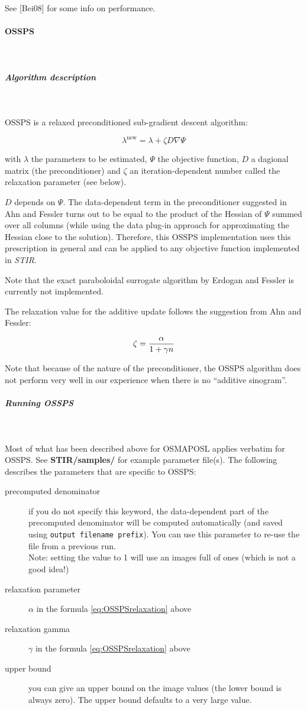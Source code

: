 \documentclass{article}
\newcommand{\subsubsubsection}[1]{\paragraph{#1}\mbox{} \\}
\newcommand{\subsubsubsubsection}[1]{\subparagraph{#1} \mbox{} \\}
\begin{document}
See [Bei08] for some info on performance.

{ \subsubsubsection{OSSPS}
}
\label{sec:OSSPS}
  { \subsubsubsubsection{Algorithm description}
  }
  OSSPS is a relaxed preconditioned sub-gradient descent algorithm:

  \[ \lambda^\mathrm{new} = \lambda + \zeta D \nabla \Psi \]

  with $\lambda$ the parameters to be estimated,
  $\Psi$ the objective function,
  $D$ a dagional matrix (the preconditioner)
  and $\zeta$ an iteration-dependent number called the relaxation parameter (see below).

  $D$ depends on $\Psi$. The data-dependent term in the preconditioner 
  suggested in Ahn and Fessler turns out to be equal to the product of the Hessian of 
  $\Psi$ summed over all columns (while using the data plug-in approach for 
  approximating the Hessian close to the solution). Therefore, this OSSPS 
  implementation uses this prescription in general and can be applied to any objective
   function implemented in \textit{STIR}.  

  Note that the exact paraboloidal surrogate algorithm by Erdogan and Fessler is currently
  not implemented.

  The relaxation value for the additive update follows the suggestion from Ahn and Fessler:

 \begin{equation}
  \zeta= { \alpha \over 1+ \gamma n } \label{eq:OSSPSrelaxation}
 \end{equation} 

  Note that because of the nature of the preconditioner, the OSSPS algorithm does not
  perform very well in our experience when there is no ``additive sinogram''.

{ \subsubsubsubsection{Running OSSPS}
}

 Most of what has been described above for OSMAPOSL applies verbatim for OSSPS. 
 See \textbf{STIR/samples/} for example parameter file(s). The
 following describes the parameters that are specific to OSSPS:

 \begin{description}
 \item[precomputed denominator]
   if you do not specify this keyword, the data-dependent part of the
   precomputed denominator will be computed automatically (and saved using
   \texttt{output filename prefix}). You can use this parameter to
   re-use the file from a previous run. \\
   Note: setting the value to 1 will use an images full of ones (which is not a good idea!)

 \item[relaxation parameter]
   $\alpha$ in the formula \ref{eq:OSSPSrelaxation} above
 \item[relaxation gamma]
   $\gamma$ in the formula \ref{eq:OSSPSrelaxation} above

 \item[upper bound]
  you can give an upper bound on the image values (the lower bound is always zero). The upper
  bound defaults to a very large value.
\end{description}
\end{document}
